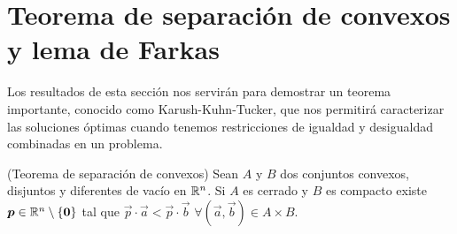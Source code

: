 

\section{Teorema de separaci\'on de convexos y lema de Farkas}

Los resultados de esta secci\'on nos servir\'an para demostrar un teorema importante, conocido como Karush-Kuhn-Tucker, que nos permitir\'a caracterizar las soluciones \'optimas cuando tenemos restricciones de igualdad y desigualdad combinadas en un problema.

\begin{teorema}{\rm (Teorema de separaci\'on de convexos)}\label{teo-separacion}
Sean $A$ y $B$ dos conjuntos convexos, disjuntos y diferentes de vac\'io en $\mathbb{R}^n$. Si $A$ es cerrado y $B$ es compacto existe $\boldsymbol{p}\in \mathbb{R}^n\setminus \{\boldsymbol{0}\}$ tal que $\vec{p}\cdot \vec{a} < \vec{p}\cdot \vec{b} \, \, \forall (\vec{a},\vec{b})\in A\times B$.
\end{teorema}

